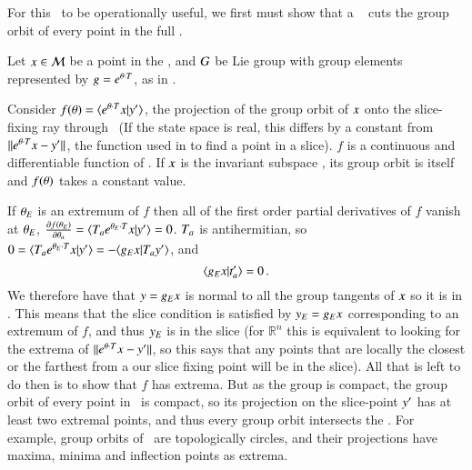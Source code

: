 For this \slice\ to be operationally useful, we first must show that a \slice\ 
cuts the group orbit of every point in the full \statesp.

Let $x \in {\cal M}$ be a point in the \statesp, and $G$ be Lie group with group elements represented  by $g=e^{{\bf \theta} \cdot T}$, as in .

Consider $f(\gSpace)=\braket{e^{\gSpace \cdot \Lg} \ssp}{\slicep}$, the projection of the group orbit of $x$ onto the slice-fixing ray through \slicep\ (If the state space is real, this differs by a constant from $\|e^{{\bf \theta} \cdot T}x - {y'}\|$, the function used in to find a point in a slice).
$f$ is a continuous and differentiable function of \gSpace. If $x$ is the invariant subspace , its group orbit is itself and $f({\bf \theta})$ takes a constant value.

If ${\bf \theta}_E$ is an extremum of $f$ then all of the first order partial derivatives of $f$ vanish at ${\bf \theta}_E$, $\frac{\partial f(\gSpace_E)}{\partial \gSpace_a} =\braket{\Lg_a e^{\gSpace_E \cdot \Lg} \ssp}{\slicep}=0$. $T_a$ is antihermitian, so
$0=\braket{\Lg_a e^{\gSpace_E \cdot \Lg}\ssp}{\slicep}
= - \braket{\LieEl_E \ssp}{\Lg_a  \slicep}$,
and
\[
\braket{\LieEl_E \ssp}{\sliceTan{a}} =0
\,.
\]
We therefore have that $y= g_E x$ is normal to all the group tangents of $x$ so it is in \pSRed. This means that the slice condition is satisfied by $y_E = g_E x$ corresponding to an extremum of $f$, and thus $y_E$ is in the slice (for $\mathbb{R}^n$ this is equivalent to looking for the extrema of $\|e^{{\bf \theta} \cdot T}x - {y'}\|$, so this says that any points that are locally the closest or the farthest from a our slice fixing point will be in the slice). All that is left to do then is to show that $f$ has extrema. But as the group is compact, the group orbit of every point in \pS\ is compact, so its projection on the slice-point ${y'}$ has at least two extremal points, and thus every group orbit intersects the \slice. For example, group orbits of \ are topologically circles, and their projections have maxima, minima and inflection points as extrema.



